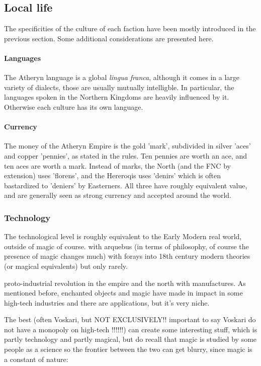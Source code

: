 \subsection{Local life}



The specificities of the culture of each faction have been mostly introduced in the previous section. Some additional considerations are presented here.

\paragraph{Languages}

The Atheryn language is a global \textit{lingua franca}, although it comes in a large variety of dialects, those are usually mutually intelligble. In particular, the languages spoken in the Northern Kingdoms are heavily influenced by it. Otherwise each culture has its own language.

\paragraph{Currency}

The money of the Atheryn Empire is the gold 'mark', subdivided in silver 'aces' and copper 'pennies', as stated in the rules. Ten pennies are worth an ace, and ten aces are worth a mark. Instead of marks, the North (and the FNC by extension) uses 'florens', and the Hereroqis uses 'denirs' which is often bastardized to 'deniers' by Easterners. All three have roughly equivalent value, and are generally seen as strong currency and accepted around the world.


\subsubsection{Technology}

The technological level is roughly equivalent to the Early Modern real world, outside of magic of course. with arquebus (in terms of philosophy, of course the presence of magic changes much) with forays into 18th century modern theories (or magical equivalents) but only rarely.

proto-industrial revolution in the empire and the north with manufactures. As mentioned before, enchanted objects and magic have made in impact in some high-tech industries and there are applications, but it's very niche.

The best (often Voskari, but NOT EXCLUSIVELY!! important to say Voskari do not have a monopoly on high-tech !!!!!!) can create some interesting stuff, which is partly technology and partly magical, but do recall that magic is studied by some people as a science so the frontier between the two can get blurry, since magic is a constant of nature:




